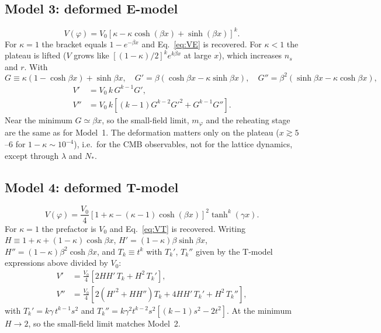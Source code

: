 \documentclass[11pt,a4paper]{article}
\begin{document}
\subsection{Model 3: deformed E-model}
\label{sec:dE}
\begin{equation}
V(\varphi) = V_0\left[\kappa-\kappa\cosh(\beta x)+\sinh(\beta x)\right]^{k}.
\label{eq:VdE}
\end{equation}
For $\kappa=1$ the bracket equals $1-e^{-\beta x}$ and Eq.~\eqref{eq:VE} is recovered. For $\kappa<1$ the plateau is lifted ($V$ grows like $[(1-\kappa)/2]^k e^{k\beta x}$ at large $x$), which increases $n_s$ and $r$. With
\begin{equation}
G\equiv\kappa(1-\cosh\beta x)+\sinh\beta x,\quad
G'=\beta(\cosh\beta x-\kappa\sinh\beta x),\quad
G''=\beta^2(\sinh\beta x-\kappa\cosh\beta x),
\end{equation}
\begin{align}
V' &= V_0\,k\,G^{k-1}G', \\
V'' &= V_0\,k\left[(k-1)G^{k-2}G'^2+G^{k-1}G''\right].
\end{align}
Near the minimum $G\simeq\beta x$, so the small-field limit, $m_\varphi$ and the reheating stage are the same as for Model~1. The deformation matters only on the plateau ($x\gtrsim 5$--6 for $1-\kappa\sim 10^{-4}$), i.e.\ for the CMB observables, not for the lattice dynamics, except through $\lambda$ and $N_*$.

\subsection{Model 4: deformed T-model}
\label{sec:dT}
\begin{equation}
V(\varphi) = \frac{V_0}{4}\left[1+\kappa-(\kappa-1)\cosh(\beta x)\right]^{2}\tanh^{k}(\gamma x).
\label{eq:VdT}
\end{equation}
For $\kappa=1$ the prefactor is $V_0$ and Eq.~\eqref{eq:VT} is recovered. Writing $H\equiv 1+\kappa+(1-\kappa)\cosh\beta x$, $H'=(1-\kappa)\beta\sinh\beta x$, $H''=(1-\kappa)\beta^2\cosh\beta x$, and $T_k\equiv t^k$ with $T_k'$, $T_k''$ given by the T-model expressions above divided by $V_0$:
\begin{align}
V' &= \frac{V_0}{4}\left[2HH'\,T_k+H^2\,T_k'\right], \\
V'' &= \frac{V_0}{4}\left[2\left(H'^2+HH''\right)T_k+4HH'\,T_k'+H^2\,T_k''\right],
\end{align}
with $T_k' = k\gamma\,t^{k-1}s^2$ and $T_k''=k\gamma^2 t^{k-2}s^2[(k-1)s^2-2t^2]$. At the minimum $H\to 2$, so the small-field limit matches Model~2.
\end{document}
